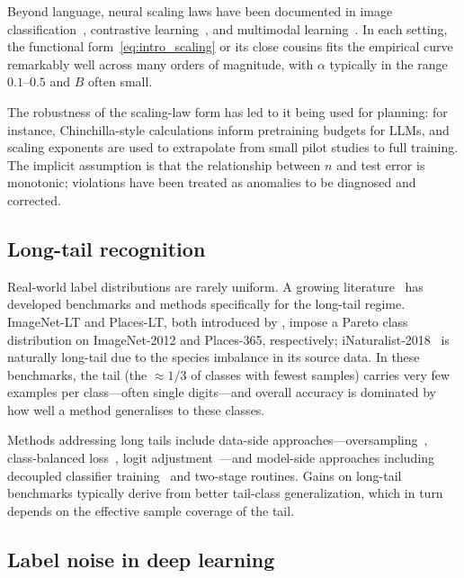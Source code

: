\documentclass[11pt]{article}
\begin{document}
Beyond language, neural scaling laws have been documented in image classification~\cite{sharma2022}, contrastive learning~\cite{cherti2023}, and multimodal learning~\cite{radford2021}. In each setting, the functional form~\eqref{eq:intro_scaling} or its close cousins fits the empirical curve remarkably well across many orders of magnitude, with $\alpha$ typically in the range $0.1$--$0.5$ and $B$ often small.

The robustness of the scaling-law form has led to it being used for planning: for instance, Chinchilla-style calculations inform pretraining budgets for LLMs, and scaling exponents are used to extrapolate from small pilot studies to full training. The implicit assumption is that the relationship between $n$ and test error is monotonic; violations have been treated as anomalies to be diagnosed and corrected.

\subsection{Long-tail recognition}

Real-world label distributions are rarely uniform. A growing literature~\cite{liu2019longtail, cui2019classbalanced, cao2019ldam, menon2021} has developed benchmarks and methods specifically for the long-tail regime. ImageNet-LT and Places-LT, both introduced by \citet{liu2019longtail}, impose a Pareto class distribution on ImageNet-2012 and Places-365, respectively; iNaturalist-2018~\cite{vanhorn2018inaturalist} is naturally long-tail due to the species imbalance in its source data. In these benchmarks, the tail (the $\approx\! 1/3$ of classes with fewest samples) carries very few examples per class---often single digits---and overall accuracy is dominated by how well a method generalises to these classes.

Methods addressing long tails include data-side approaches---oversampling~\cite{buda2018}, class-balanced loss~\cite{cui2019classbalanced}, logit adjustment~\cite{menon2021}---and model-side approaches including decoupled classifier training~\cite{kang2020decoupling} and two-stage routines. Gains on long-tail benchmarks typically derive from better tail-class generalization, which in turn depends on the effective sample coverage of the tail.

\subsection{Label noise in deep learning}
\end{document}
